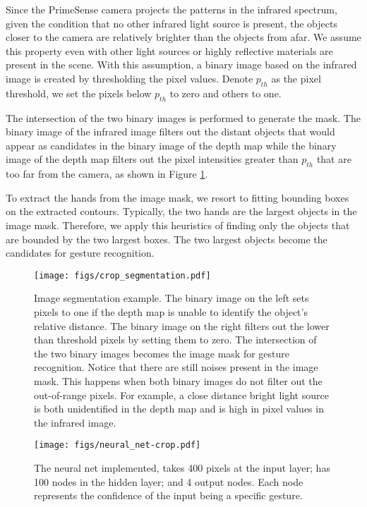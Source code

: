 \documentclass[conference]{IEEEtran}
\begin{document}
Since the PrimeSense camera projects the patterns in the infrared spectrum, given the condition that no other infrared light source is present, the objects closer to the camera are relatively brighter than the objects from afar. We assume this property even with other light sources or highly reflective materials are present in the scene. With this assumption, a binary image based on the infrared image is created by thresholding the pixel values. Denote $p_{th}$ as the pixel threshold, we set the pixels below $p_{th}$ to zero and others to one.

The intersection of the two binary images is performed to generate the mask. The binary image of the infrared image filters out the distant objects that would appear as candidates in the binary image of the depth map while the binary image of the depth map filters out the pixel intensities greater than $p_{th}$ that are too far from the camera, as shown in Figure \ref{image_segmentation}. 

To extract the hands from the image mask, we resort to fitting bounding boxes on the extracted contours. Typically, the two hands are the largest objects in the image mask. Therefore, we apply this heuristics of finding only the objects that are bounded by the two largest boxes. The two largest objects become the candidates for gesture recognition.

\begin{figure} \centering \texttt{[image: figs/crop\_segmentation.pdf]} \caption{Image segmentation example. The binary image on the left sets pixels to one if the depth map is unable to identify the object's relative distance. The binary image on the right filters out the lower than threshold pixels by setting them to zero. The intersection of the two binary images becomes the image mask for gesture recognition. Notice that there are still noises present in the image mask. This happens when both binary images do not filter out the out-of-range pixels. For example, a close distance bright light source is both unidentified in the depth map and is high in pixel values in the infrared image.}\label{image_segmentation} \end{figure}

\begin{figure}
\centering
\texttt{[image: figs/neural\_net-crop.pdf]}
\caption{The neural net implemented, takes 400 pixels at the input layer; has 100 nodes in the hidden layer; and 4 output nodes. Each node represents the confidence of the input being a specific gesture.}
\label{neural_net}
\end{figure}
\end{document}
